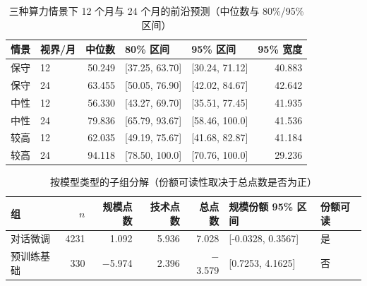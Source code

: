 \begin{table}[htbp]
  \centering
  \caption{三种算力情景下 12 个月与 24 个月的前沿预测（中位数与 80\%/95\% 区间）}
  \label{tab:app-q4-scenario}
  \small
  \begin{tabular}{@{}rlrllr@{}}
    \toprule
    情景 & 视界/月 & 中位数 & 80\% 区间 & 95\% 区间 & 95\% 宽度 \\
    \midrule
    保守 & 12 & 50.249 & [37.25, 63.70] & [30.24, 71.12] & 40.883 \\
    保守 & 24 & 63.455 & [50.05, 76.90] & [42.02, 84.67] & 42.642 \\
    中性 & 12 & 56.330 & [43.27, 69.70] & [35.51, 77.45] & 41.935 \\
    中性 & 24 & 79.836 & [65.79, 93.67] & [58.46, 100.0] & 41.536 \\
    较高 & 12 & 62.035 & [49.19, 75.67] & [41.68, 82.87] & 41.184 \\
    较高 & 24 & 94.118 & [78.50, 100.0] & [70.76, 100.0] & 29.236 \\
    \bottomrule
  \end{tabular}
\end{table}

\begin{table}[htbp]
  \centering
  \caption{按模型类型的子组分解（份额可读性取决于总点数是否为正）}
  \label{tab:app-q4-group}
  \small
  \begin{tabular}{@{}lrrrrll@{}}
    \toprule
    组 & $n$ & 规模点数 & 技术点数 & 总点数 & 规模份额 95\% 区间 & 份额可读 \\
    \midrule
    对话微调 & 4231 & 1.092 & 5.936 & 7.028 & [-0.0328, 0.3567] & 是 \\
    预训练基础 & 330 & $-$5.974 & 2.396 & $-$3.579 & [0.7253, 4.1625] & 否 \\
    \bottomrule
  \end{tabular}
\end{table}

